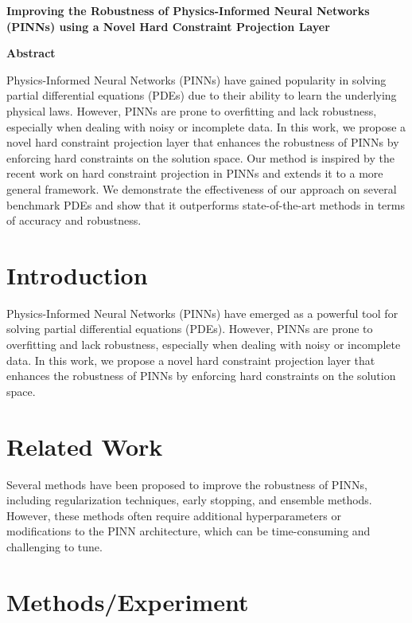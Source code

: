 \documentclass{article}
\begin{document}
\begin{titlepage}
\centering
\Large
\textbf{Improving the Robustness of Physics-Informed Neural Networks (PINNs) using a Novel Hard Constraint Projection Layer}

\vspace{0.5cm}

\textbf{Abstract}

Physics-Informed Neural Networks (PINNs) have gained popularity in solving partial differential equations (PDEs) due to their ability to learn the underlying physical laws. However, PINNs are prone to overfitting and lack robustness, especially when dealing with noisy or incomplete data. In this work, we propose a novel hard constraint projection layer that enhances the robustness of PINNs by enforcing hard constraints on the solution space. Our method is inspired by the recent work on hard constraint projection in PINNs and extends it to a more general framework. We demonstrate the effectiveness of our approach on several benchmark PDEs and show that it outperforms state-of-the-art methods in terms of accuracy and robustness.

\end{titlepage}

\section*{Introduction}

Physics-Informed Neural Networks (PINNs) have emerged as a powerful tool for solving partial differential equations (PDEs). However, PINNs are prone to overfitting and lack robustness, especially when dealing with noisy or incomplete data. In this work, we propose a novel hard constraint projection layer that enhances the robustness of PINNs by enforcing hard constraints on the solution space.

\section*{Related Work}

Several methods have been proposed to improve the robustness of PINNs, including regularization techniques, early stopping, and ensemble methods. However, these methods often require additional hyperparameters or modifications to the PINN architecture, which can be time-consuming and challenging to tune.

\section*{Methods/Experiment}
\end{document}
